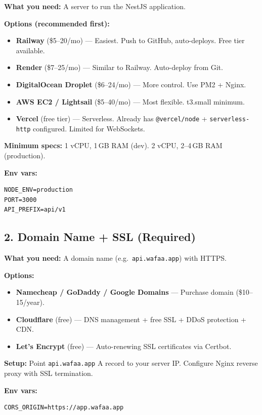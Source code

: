 \documentclass[a4paper,11pt]{article}
\begin{document}
\begin{clientbox}
\textbf{What you need:} A server to run the NestJS application.

\textbf{Options (recommended first):}
\begin{itemize}[leftmargin=1.5em]
    \item \textbf{Railway} (\$5--20/mo) --- Easiest. Push to GitHub, auto-deploys. Free tier available.
    \item \textbf{Render} (\$7--25/mo) --- Similar to Railway. Auto-deploy from Git.
    \item \textbf{DigitalOcean Droplet} (\$6--24/mo) --- More control. Use PM2 + Nginx.
    \item \textbf{AWS EC2 / Lightsail} (\$5--40/mo) --- Most flexible. t3.small minimum.
    \item \textbf{Vercel} (free tier) --- Serverless. Already has \texttt{@vercel/node} + \texttt{serverless-http} configured. Limited for WebSockets.
\end{itemize}

\textbf{Minimum specs:} 1 vCPU, 1\,GB RAM (dev). 2 vCPU, 2--4\,GB RAM (production).

\textbf{Env vars:}
\begin{lstlisting}
NODE_ENV=production
PORT=3000
API_PREFIX=api/v1
\end{lstlisting}
\end{clientbox}

\subsection{2. Domain Name + SSL (Required)}

\begin{clientbox}
\textbf{What you need:} A domain name (e.g.\ \texttt{api.wafaa.app}) with HTTPS.

\textbf{Options:}
\begin{itemize}[leftmargin=1.5em]
    \item \textbf{Namecheap / GoDaddy / Google Domains} --- Purchase domain (\$10--15/year).
    \item \textbf{Cloudflare} (free) --- DNS management + free SSL + DDoS protection + CDN.
    \item \textbf{Let's Encrypt} (free) --- Auto-renewing SSL certificates via Certbot.
\end{itemize}

\textbf{Setup:} Point \texttt{api.wafaa.app} A record to your server IP. Configure Nginx reverse proxy with SSL termination.

\textbf{Env vars:}
\begin{lstlisting}
CORS_ORIGIN=https://app.wafaa.app
\end{lstlisting}
\end{clientbox}
\end{document}
